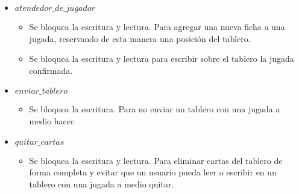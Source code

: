 \begin{itemize}

\item $atendedor\_de\_jugador$

\begin{itemize}
\item Se bloquea la escritura y lectura. Para agregar una nueva ficha a una jugada, reservando de esta manera una posición del tablero.

\item Se bloquea la escritura y lectura para escribir sobre el tablero la jugada confirmada.

\end{itemize}

\item $enviar\_tablero$

\begin{itemize}

\item Se bloquea la escritura. Para no enviar un tablero con una jugada a medio hacer.

\end{itemize}

\item $quitar\_cartas$

\begin{itemize}

\item Se bloquea la escritura y lectura. Para eliminar cartas del tablero de forma completa y evitar que un usuario pueda leer o escribir en un tablero con una jugada a medio quitar.

\end{itemize}

\end{itemize}

%
%
